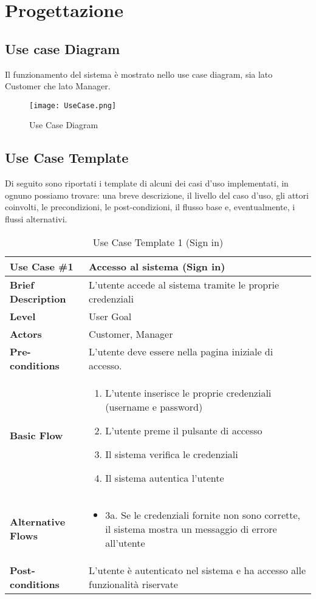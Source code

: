 \documentclass{article}
\begin{document}
\section{Progettazione}
\subsection{Use case Diagram}
Il funzionamento del sistema è mostrato nello use case diagram, sia lato Customer che lato Manager.
\begin{figure}[h!]
    \centering
    \texttt{[image: UseCase.png]}
    \caption{Use Case Diagram}
    \label{fig:use_case_diagram}
\end{figure}
\newpage
\subsection{Use Case Template}
Di seguito sono riportati i template di alcuni dei casi d’uso implementati, in ognuno possiamo trovare: una breve descrizione, il livello del caso d’uso, gli attori coinvolti, le precondizioni, le post-condizioni, il flusso base e, eventualmente, i flussi alternativi.
\begin{table}[h!]
    \centering
    \begin{tabular}{|l|p{10cm}|}
        \hline
        \textbf{Use Case \#1} & Accesso al sistema (Sign in) \\ \hline
        \textbf{Brief Description} & L’utente accede al sistema tramite le proprie credenziali\\ \hline
        \textbf{Level} & User Goal \\ \hline
        \textbf{Actors} & Customer, Manager \\ \hline
        \textbf{Pre-conditions} & L’utente deve essere nella pagina iniziale di accesso. \\ \hline
        \textbf{Basic Flow} & 
        \begin{enumerate}
            \item L’utente inserisce le proprie credenziali (username e password)
            \item L’utente preme il pulsante di accesso
            \item Il sistema verifica le credenziali
            \item Il sistema autentica l’utente
        \end{enumerate} \\ \hline
        \textbf{Alternative Flows} & 
        \begin{itemize}
            \item 3a. Se le credenziali fornite non sono corrette, il sistema mostra un messaggio di errore all’utente
        \end{itemize} \\ \hline
        \textbf{Post-conditions} & L’utente è autenticato nel sistema e ha accesso alle funzionalità riservate \\ \hline
    \end{tabular}
    \caption{Use Case Template 1 (Sign in)}
    \label{tab:use_case_1}
\end{table}
\end{document}

